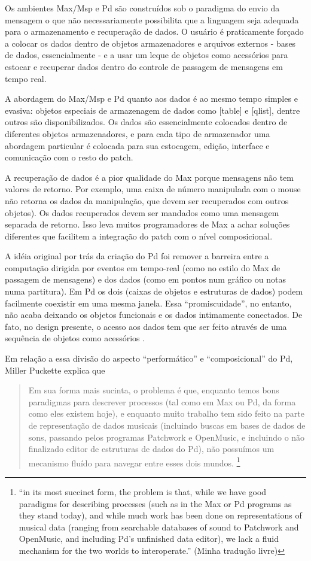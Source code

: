 \documentclass{ppgmus}
\begin{document}
Os ambientes Max/Msp e Pd são construídos sob o paradigma do envio
da mensagem o que não necessariamente possibilita que a linguagem seja
adequada para o armazenamento e recuperação de dados. O usuário é
praticamente forçado a colocar os dados dentro de objetos armazenadores e 
arquivos externos - bases
de dados, essencialmente - e a usar um leque de objetos como
acessórios para estocar e recuperar dados dentro do controle de
passagem de mensagens em tempo real.

A abordagem do Max/Msp e Pd quanto aos dados é ao mesmo tempo simples e
evasiva: objetos especiais de armazenagem de dados como
[table] e [qlist], dentre outros são disponibilizados. Os
dados são essencialmente colocados dentro de diferentes objetos armazenadores, e
para cada tipo de armazenador uma abordagem particular é colocada
para sua estocagem, edição, interface e comunicação com o resto do
patch.

A recuperação de dados é a pior qualidade do Max porque mensagens não tem valores de
retorno. Por exemplo, uma caixa de número manipulada com o mouse não
retorna os dados da manipulação, que devem ser recuperados com outros
objetos). Os dados recuperados devem ser mandados como uma mensagem
separada de retorno. Isso leva muitos programadores de Max a achar
soluções diferentes que facilitem a integração do patch com o nível
composicional.

A idéia original por trás da criação do Pd foi remover a barreira
entre a computação dirigida por eventos em tempo-real (como no estilo
do Max de passagem de mensagens) e dos dados (como em pontos num
gráfico ou notas numa partitura). Em Pd os dois (caixas de objetos e
estruturas de dados) podem facilmente coexistir em uma mesma janela.
Essa ``promiscuidade'', no entanto, não acaba deixando os objetos
funcionais e os dados intimamente conectados. De fato, no design
presente, o acesso aos dados tem que ser feito através de uma
sequência de objetos como acessórios .

Em relação a essa divisão do aspecto ``performático'' e
``composicional'' do Pd, Miller Puckette explica que

\begin{quote}
Em sua forma mais sucinta, o problema é que, enquanto temos bons
paradigmas para descrever processos (tal como em Max ou Pd, da forma como
eles existem hoje), e enquanto muito trabalho tem sido feito na parte 
de representação de dados musicais (incluindo buscas em bases de dados
de sons, passando pelos programas Patchwork e OpenMusic, e incluindo
o não finalizado editor de estruturas de dados do Pd), não possuímos
um mecanismo fluído para navegar entre esses dois mundos. \cite{puckette04:divide}
  \footnote{``in its most succinct form, the problem is that, while we have good
  paradigms for describing processes (such as in the Max or Pd
  programs as they stand today), and while much work has been done on
  representations of musical data (ranging from searchable databases
  of sound to Patchwork and OpenMusic, and including Pd's unfinished
  data editor), we lack a fluid mechanism for the two worlds to
  interoperate.'' (Minha tradução livre)} 
\end{quote}
\end{document}
